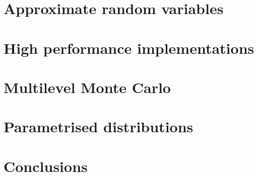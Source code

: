 \documentclass[manuscript]{acmart}
\begin{document}
\section{Approximate random variables}
\label{sec:approximate_random_variables}

\section{High performance implementations}
\label{sec:high_performance_impementations}

\section{Multilevel Monte Carlo}
\label{sec:multilevel_monte_carlo}

\section{Parametrised distributions}
\label{sec:parametrised_distributions}

\section{Conclusions}
\label{sec:conclusions}







\end{document}
